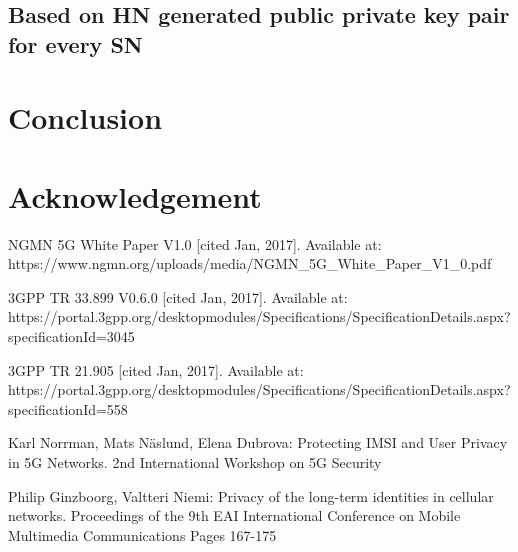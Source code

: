 \documentclass[lnicst,sechang,a4paper]{svmultln}
\begin{document}
\subsection{Based on HN generated public private key pair for every SN}

\section{Conclusion}
\label{sec:conclusion}

\section{Acknowledgement}
\label{sec:acknowledgement}



\begin{thebibliography}{4}

 NGMN 5G White Paper V1.0 [cited Jan, 2017]. Available at: https://www.ngmn.org/uploads/media/NGMN\_5G\_White\_Paper\_V1\_0.pdf

 3GPP TR 33.899 V0.6.0 [cited Jan, 2017]. Available at: https://portal.3gpp.org/desktopmodules/Specifications/SpecificationDetails.aspx?\\specificationId=3045

 3GPP TR 21.905 [cited Jan, 2017]. Available at: https://portal.3gpp.org/desktopmodules/Specifications/SpecificationDetails.aspx?\\specificationId=558


 Karl Norrman, Mats Näslund, Elena Dubrova: Protecting IMSI and User Privacy in 5G Networks. 2nd International Workshop on 5G Security

 Philip Ginzboorg,  Valtteri Niemi: Privacy of the long-term identities in cellular networks. Proceedings of the 9th EAI International Conference on Mobile Multimedia Communications
Pages 167-175




\end{thebibliography}
\end{document}
